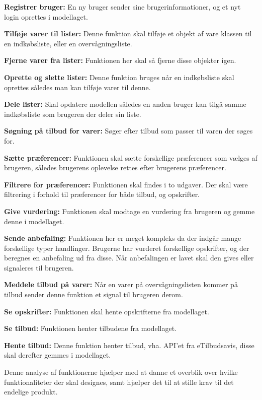 \textbf{Registrer bruger:} En ny bruger sender sine brugerinformationer, og et nyt login oprettes i modellaget.

\textbf{Tilføje varer til lister:} Denne funktion skal tilføje et objekt af vare klassen til en indkøbsliste, eller en overvågningsliste.

\textbf{Fjerne varer fra lister:} Funktionen her skal så fjerne disse objekter igen.

\textbf{Oprette og slette lister:} Denne funktion bruges når en indkøbsliste skal oprettes således man kan tilføje varer til denne.

\textbf{Dele lister:} Skal opdatere modellen således en anden bruger kan tilgå samme indkøbsliste som brugeren der deler sin liste. 

\textbf{Søgning på tilbud for varer:} Søger efter tilbud som passer til varen der søges for.

\textbf{Sætte præferencer:} Funktionen skal sætte forskellige præferencer som vælges af brugeren, således brugerens oplevelse rettes efter brugerens præferencer.

\textbf{Filtrere for præferencer:} Funktionen skal findes i to udgaver. Der skal være filtrering i forhold til præferencer for både tilbud, og opskrifter.

\textbf{Give vurdering:} Funktionen skal modtage en vurdering fra brugeren og gemme denne i modellaget.

\textbf{Sende anbefaling:} Funktionen her er meget kompleks da der indgår mange forskellige typer handlinger. 
Brugerne har vurderet forskellige opskrifter, og der beregnes en anbefaling ud fra disse.
Når anbefalingen er lavet skal den gives eller signaleres til brugeren.

\textbf{Meddele tilbud på varer:} Når en varer på overvågningslisten kommer på tilbud sender denne funktion et signal til brugeren derom.

\textbf{Se opskrifter:} Funktionen skal hente opskrifterne fra modellaget.

\textbf{Se tilbud:} Funktionen henter tilbudene fra modellaget.

\textbf{Hente tilbud:} Denne funktion henter tilbud, vha. API'et fra eTilbudsavis, disse skal derefter gemmes i modellaget.

Denne analyse af funktionerne hjælper med at danne et overblik over hvilke funktionaliteter der skal designes, samt hjælper det til at stille krav til det endelige produkt.

